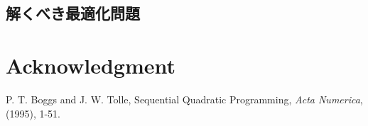 \documentclass{jarticle}
\begin{document}
\subsection{解くべき最適化問題}

\section*{Acknowledgment}


\begin{thebibliography}{99}
P. T. Boggs and J. W. Tolle,
Sequential Quadratic Programming,
{\it Acta Numerica}, (1995), 1-51.
\end{thebibliography}
\end{document}
